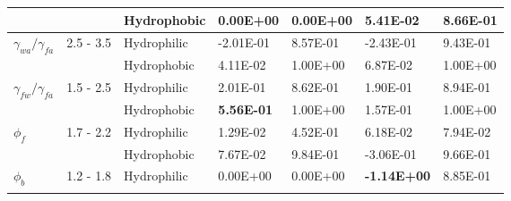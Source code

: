 \documentclass[english]{achemso}
\begin{document}
\begin{table}[H]
\begin{tabular}{|l|l|l|l|l|l|l|}
                                    &                                 & Hydrophobic                                              & 0.00E+00                                  & 0.00E+00                               & 5.41E-02                                  & 8.66E-01                               \\ \hline
\multirow{2}{*}{$\gamma_{wa}/\gamma_{fa}$}              & \multirow{2}{*}{2.5 - 3.5}       & Hydrophilic                                              & -2.01E-01                                 & 8.57E-01                               & -2.43E-01                                 & 9.43E-01                               \\ \cline{3-7} 
                                    &                                 & Hydrophobic                                              & 4.11E-02                                  & 1.00E+00                               & 6.87E-02                                  & 1.00E+00                               \\ \hline
\multirow{2}{*}{$\gamma_{fw}/\gamma_{fa}$}              & \multirow{2}{*}{1.5 - 2.5}       & Hydrophilic                                              & 2.01E-01                                  & 8.62E-01                               & 1.90E-01                                  & 8.94E-01                               \\ \cline{3-7} 
                                    &                                 & Hydrophobic                                              & \textbf{5.56E-01}                                  & 1.00E+00                               & 1.57E-01                                  & 1.00E+00                               \\ \hline
\multirow{2}{*}{$\phi_{f}$}             & \multirow{2}{*}{1.7 - 2.2}       & Hydrophilic                                              & 1.29E-02                                  & 4.52E-01                               & 6.18E-02                                  & 7.94E-02                               \\ \cline{3-7} 
                                    &                                 & Hydrophobic                                              & 7.67E-02                                  & 9.84E-01                               & -3.06E-01                                 & 9.66E-01                               \\ \hline
\multirow{2}{*}{$\phi_{b}$}             & \multirow{2}{*}{1.2 - 1.8}       & Hydrophilic                                              & 0.00E+00                                  & 0.00E+00                               & \textbf{-1.14E+00}                                 & 8.85E-01                               \\ \cline{3-7} 

\end{tabular}
\end{table}
\end{document}
